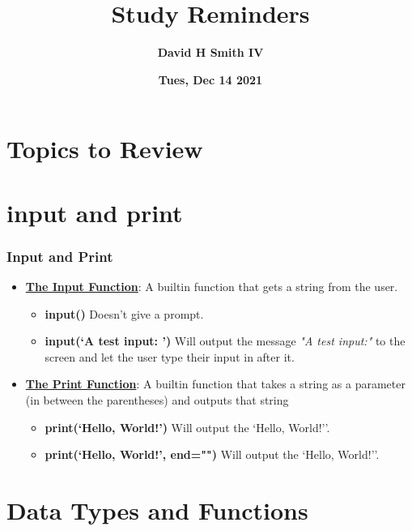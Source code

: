 \documentclass[xcolor=table]{beamer}
\title{\textbf{Study Reminders}}
\author{\textbf{David H Smith IV}}
\institute[\textbf{UIUC}]{\textbf{University of Illinois Urbana-Champaign}}
\date{\textbf{Tues, Dec 14 2021}}
\begin{document}
\frame{\titlepage}

\section{Topics to Review}

\section{input and print}
\begin{frame}
  \frametitle{Input and Print}
  \begin{itemize}
    \item \underline{\textbf{The Input Function}}: A builtin function that gets a string from the user.
      \pause
      \begin{itemize}
        \item \textbf{input()} \textrightarrow Doesn't give a prompt.
          \pause
        \item \textbf{input(`A test input: ')} \textrightarrow Will output the message \textit{"A test input:"} to the screen and let the user type their input in after it.
          \pause
      \end{itemize}
    \item \underline{\textbf{The Print Function}}: A builtin function that takes a string as a parameter (in between the parentheses) and outputs that string
      \pause
      \begin{itemize}
        \item \textbf{print(`Hello, World!')} \textrightarrow Will output the `Hello, World!\n''. 
        \item \textbf{print(`Hello, World!', end="")} \textrightarrow Will output the `Hello, World!''. 
      \end{itemize}
  \end{itemize}
\end{frame}

\section{Data Types and Functions}
\end{document}
